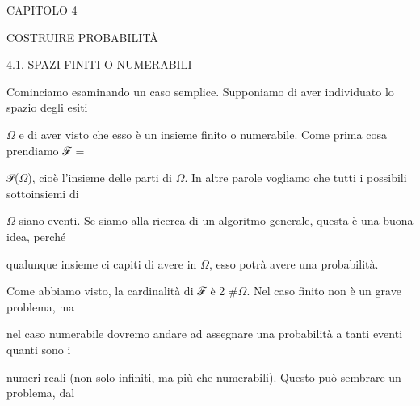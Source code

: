 \documentclass[a4paper,portrait,12pt]{article}
\begin{document}
\begin{flushleft}
\newpage
CAPITOLO 4
\end{flushleft}


\begin{flushleft}
COSTRUIRE PROBABILIT\`{A}
\end{flushleft}


\begin{flushleft}
4.1. SPAZI FINITI O NUMERABILI
\end{flushleft}


\begin{flushleft}
Cominciamo esaminando un caso semplice. Supponiamo di aver individuato lo spazio degli esiti
\end{flushleft}


\begin{flushleft}
$\Omega$ e di aver visto che esso \`{e} un insieme finito o numerabile. Come prima cosa prendiamo ℱ =
\end{flushleft}


\begin{flushleft}
𝒫($\Omega$), cio\`{e} l'insieme delle parti di $\Omega$. In altre parole vogliamo che tutti i possibili sottoinsiemi di
\end{flushleft}


\begin{flushleft}
$\Omega$ siano eventi. Se siamo alla ricerca di un algoritmo generale, questa \`{e} una buona idea, perch\'{e}
\end{flushleft}


\begin{flushleft}
qualunque insieme ci capiti di avere in $\Omega$, esso potr\`{a} avere una probabilit\`{a}.
\end{flushleft}


\begin{flushleft}
Come abbiamo visto, la cardinalit\`{a} di ℱ \`{e} 2 \#$\Omega$. Nel caso finito non \`{e} un grave problema, ma
\end{flushleft}


\begin{flushleft}
nel caso numerabile dovremo andare ad assegnare una probabilit\`{a} a tanti eventi quanti sono i
\end{flushleft}


\begin{flushleft}
numeri reali (non solo infiniti, ma più che numerabili). Questo pu\`{o} sembrare un problema, dal
\end{flushleft}
\end{document}

